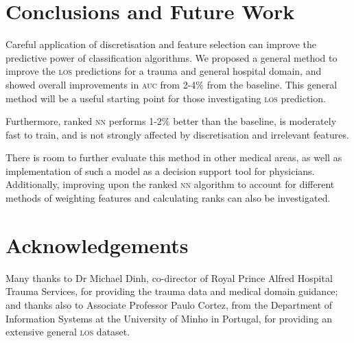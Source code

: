 \documentclass[portrait]{usydposter}
\newcommand{\acronym}[1]{\textsc{#1}\xspace}
\newcommand{\los}{\acronym{los}}
\newcommand{\auc}{\acronym{auc}}
\newcommand{\nn}{\acronym{nn}}
\begin{document}
\begin{multicols}{3}
\section{Conclusions and Future Work}
\noindent Careful application of discretisation and feature selection can
improve the predictive power of classification algorithms. We proposed a
general method to improve the \los predictions for a trauma and general
hospital domain, and showed overall improvements in \auc from 2-4\% from the
baseline. This general method will be a useful starting point for those
investigating \los prediction.

Furthermore, ranked \nn performs 1-2\% better than the baseline, is
moderately fast to train, and is not strongly affected by discretisation and
irrelevant features.

There is
room to further evaluate this method in other medical areas, as well as
implementation of such a model as a decision support tool for physicians.
Additionally, improving upon the ranked \nn algorithm to account for different
methods of weighting features and calculating ranks can also be investigated.

\section{Acknowledgements}
\noindent
Many thanks to Dr Michael Dinh, co-director of Royal Prince Alfred
Hospital Trauma Services, for providing the trauma data and medical domain
guidance; and thanks also to Associate Professor Paulo Cortez, from the
Department of Information Systems at the University of
Minho in Portugal, for providing an extensive general \los dataset.




\end{multicols}
\end{document}
